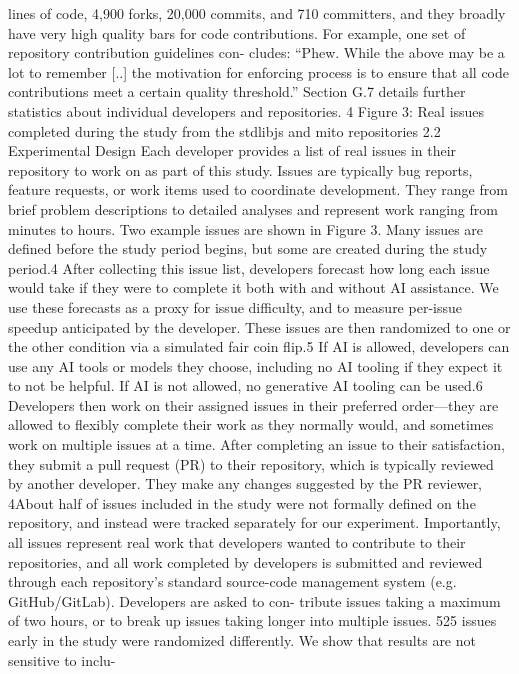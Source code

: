 lines of code, 4,900 forks, 20,000 commits, and 710 committers, and they broadly have very high
quality bars for code contributions. For example, one set of repository contribution guidelines con-
cludes: “Phew. While the above may be a lot to remember [..] the motivation for enforcing process
is to ensure that all code contributions meet a certain quality threshold.” Section G.7 details further
statistics about individual developers and repositories.
4
Figure 3: Real issues completed during the study from the stdlibjs and mito repositories
2.2
Experimental Design
Each developer provides a list of real issues in their repository to work on as part of this study.
Issues are typically bug reports, feature requests, or work items used to coordinate development.
They range from brief problem descriptions to detailed analyses and represent work ranging from
minutes to hours. Two example issues are shown in Figure 3. Many issues are defined before the
study period begins, but some are created during the study period.4
After collecting this issue list, developers forecast how long each issue would take if they were
to complete it both with and without AI assistance. We use these forecasts as a proxy for issue
difficulty, and to measure per-issue speedup anticipated by the developer. These issues are then
randomized to one or the other condition via a simulated fair coin flip.5 If AI is allowed, developers
can use any AI tools or models they choose, including no AI tooling if they expect it to not be helpful.
If AI is not allowed, no generative AI tooling can be used.6
Developers then work on their assigned issues in their preferred order—they are allowed to flexibly
complete their work as they normally would, and sometimes work on multiple issues at a time. After
completing an issue to their satisfaction, they submit a pull request (PR) to their repository, which
is typically reviewed by another developer. They make any changes suggested by the PR reviewer,
4About half of issues included in the study were not formally defined on the repository, and instead were
tracked separately for our experiment. Importantly, all issues represent real work that developers wanted to
contribute to their repositories, and all work completed by developers is submitted and reviewed through each
repository’s standard source-code management system (e.g. GitHub/GitLab). Developers are asked to con-
tribute issues taking a maximum of two hours, or to break up issues taking longer into multiple issues.
525 issues early in the study were randomized differently. We show that results are not sensitive to inclu-
